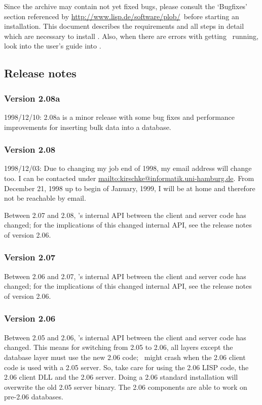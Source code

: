 Since the archive may contain not yet fixed bugs, please consult the
`Bugfixes' section referenced by
\url{http://www.lisp.de/software/plob/}\ before starting an
installation.  This document describes the requirements and all steps
in detail which are necessary to install \plob. Also, when there are
errors with getting \plob\ running, look into the user's guide into
.

\subsection{Release notes}

\subsubsection{Version 2.08a}

1998/12/10: 2.08a is a minor release with some bug fixes and performance
improvements for inserting bulk data into a database.

\subsubsection{Version 2.08}

1998/12/03: Due to changing my job end of 1998, my email address will
change too.  I can be contacted under
\url{mailto:kirschke@informatik.uni-hamburg.de}.  From December 21,
1998 up to begin of January, 1999, I will be at home and therefore not
be reachable by email.

Between 2.07 and 2.08, \plobwoexcl's internal API between the client
and server code has changed; for the implications of this changed
internal API, see the release notes of version 2.06.

\subsubsection{Version 2.07}

Between 2.06 and 2.07, \plobwoexcl's internal API between the client
and server code has changed; for the implications of this changed
internal API, see the release notes of version 2.06.

\subsubsection{Version 2.06}

Between 2.05 and 2.06, \plobwoexcl's internal API between the client
and server code has changed. This means for switching from 2.05 to
2.06, all layers except the database layer must use the new 2.06 code;
\plobwoexcl\ might crash when the 2.06 client code is used with a 2.05
server. So, take care for using the 2.06 LISP code, the 2.06 client
DLL and the 2.06 server. Doing a 2.06 standard installation will
overwrite the old 2.05 server binary. The 2.06 components are able
to work on pre-2.06 databases.

